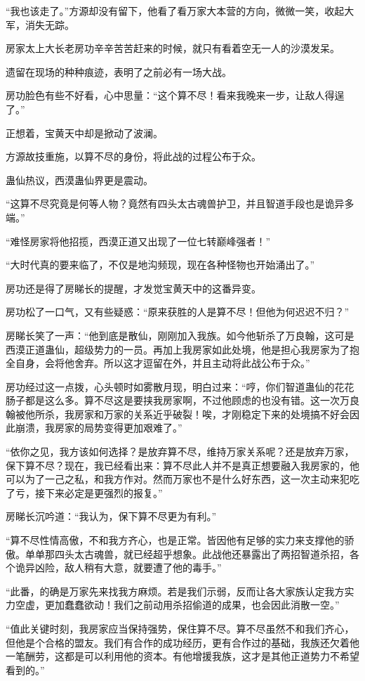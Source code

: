 \begin{this_body}
“我也该走了。”方源却没有留下，他看了看万家大本营的方向，微微一笑，收起大军，消失无踪。

房家太上大长老房功辛辛苦苦赶来的时候，就只有看着空无一人的沙漠发呆。

遗留在现场的种种痕迹，表明了之前必有一场大战。

房功脸色有些不好看，心中思量：“这个算不尽！看来我晚来一步，让敌人得逞了。”

正想着，宝黄天中却是掀动了波澜。

方源故技重施，以算不尽的身份，将此战的过程公布于众。

蛊仙热议，西漠蛊仙界更是震动。

“这算不尽究竟是何等人物？竟然有四头太古魂兽护卫，并且智道手段也是诡异多端。”

“难怪房家将他招揽，西漠正道又出现了一位七转巅峰强者！”

“大时代真的要来临了，不仅是地沟频现，现在各种怪物也开始涌出了。”

房功还是得了房睇长的提醒，才发觉宝黄天中的这番异变。

房功松了一口气，又有些疑惑：“原来获胜的人是算不尽！但他为何迟迟不归？”

房睇长笑了一声：“他到底是散仙，刚刚加入我族。如今他斩杀了万良翰，这可是西漠正道蛊仙，超级势力的一员。再加上我房家如此处境，他是担心我房家为了抱全自身，会将他舍弃。所以这才逗留在外，并且主动将此战公布于众。”

房功经过这一点拨，心头顿时如雾散月现，明白过来：“哼，你们智道蛊仙的花花肠子都是这么多。算不尽这是要挟我房家啊，不过他顾虑的也没有错。这一次万良翰被他所杀，我房家和万家的关系近乎破裂！唉，才刚稳定下来的处境搞不好会因此崩溃，我房家的局势变得更加艰难了。”

“依你之见，我方该如何选择？是放弃算不尽，维持万家关系呢？还是放弃万家，保下算不尽？现在，我已经看出来：算不尽此人并不是真正想要融入我房家的，他可以为了一己之私，和我方作对。然而万家也不是什么好东西，这一次主动来犯吃了亏，接下来必定是更强烈的报复。”

房睇长沉吟道：“我认为，保下算不尽更为有利。”

“算不尽性情高傲，不和我方齐心，也是正常。皆因他有足够的实力来支撑他的骄傲。单单那四头太古魂兽，就已经超乎想象。此战他还暴露出了两招智道杀招，各个诡异凶险，敌人稍有大意，就要遭了他的毒手。”

“此番，的确是万家先来找我方麻烦。若是我们示弱，反而让各大家族认定我方实力空虚，更加蠢蠢欲动！我们之前动用杀招偷道的成果，也会因此消散一空。”

“值此关键时刻，我房家应当保持强势，保住算不尽。算不尽虽然不和我们齐心，但他是个合格的盟友。我们有合作的成功经历，更有合作过的基础，我族还欠着他一笔酬劳，这都是可以利用他的资本。有他增援我族，这才是其他正道势力不希望看到的。”


\end{this_body}
